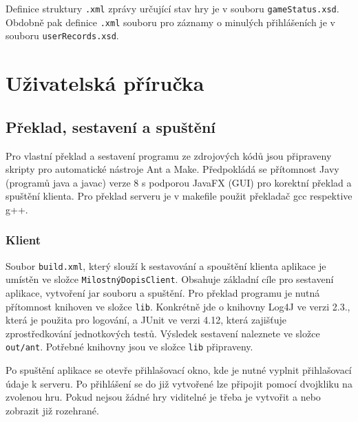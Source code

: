 \documentclass[12pt, a4paper]{article}
\begin{document}
Definice struktury \texttt{.xml} zprávy určující stav hry je v souboru \texttt{gameStatus.xsd}. Obdobně pak definice \texttt{.xml} souboru pro záznamy o minulých přihlášeních je v souboru \texttt{userRecords.xsd}. 


\section{Uživatelská příručka} %

\subsection{Překlad, sestavení a spuštění }

Pro vlastní překlad a sestavení programu ze zdrojových kódů jsou připraveny skripty pro automatické nástroje Ant a Make. Předpokládá se přítomnost Javy (programů java a javac) verze 8 s podporou JavaFX (GUI) pro korektní překlad a spuštění klienta. Pro překlad serveru je v makefile použit překladač gcc respektive g++.


\subsubsection{Klient}
Soubor \texttt{build.xml}, který slouží k sestavování a spouštění klienta aplikace je umístěn ve složce \texttt{MilostnýDopisClient}. Obsahuje základní cíle pro sestavení aplikace, vytvoření jar souboru a spuštění. Pro překlad programu je nutná přítomnost knihoven ve složce \texttt{lib}. Konkrétně jde o knihovny Log4J ve verzi 2.3., která je použita pro logování, a JUnit ve verzi 4.12, která zajišťuje zprostředkování jednotkových testů. Výsledek sestavení naleznete ve složce \texttt{out/ant}. Potřebné knihovny jsou ve složce \texttt{lib} připraveny.

Po spuštění aplikace se otevře přihlašovací okno, kde je nutné vyplnit přihlašovací údaje k serveru. Po přihlášení se do již vytvořené lze připojit pomocí dvojkliku na zvolenou hru. Pokud nejsou žádné hry viditelné je třeba je vytvořit a nebo zobrazit již rozehrané.
\end{document}
